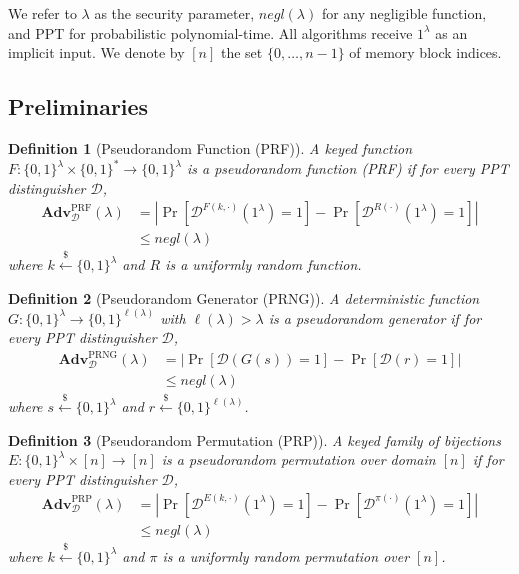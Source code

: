 \documentclass{ieeeaccess}
\newtheorem{definition}{Definition}
\newcommand{\Adv}{\mathbf{Adv}}
\begin{document}
We refer to $\lambda$ as the security parameter, $\mathit{negl}(\lambda)$ for
any negligible function, and PPT for probabilistic polynomial-time.
All algorithms receive $1^{\lambda}$ as an implicit input.
We denote by $[n]$ the set $\{0,\dots,n{-}1\}$ of memory block indices.
 
\subsection{Preliminaries}
\label{sec:prelim}
 
\begin{definition}[Pseudorandom Function (PRF)]
\label{def:prf}
A keyed function $F : \{0,1\}^{\lambda} \times \{0,1\}^{*} \to \{0,1\}^{\lambda}$
is a \emph{pseudorandom function} (PRF) if for every PPT distinguisher
$\mathcal{D}$,
\[
\begin{aligned}
  \Adv^{\mathrm{PRF}}_{\mathcal{D}}(\lambda)
  &=
  \left|
    \Pr\!\left[
      \mathcal{D}^{F(k,\cdot)}(1^{\lambda}) = 1
    \right]
    -
    \Pr\!\left[
      \mathcal{D}^{R(\cdot)}(1^{\lambda}) = 1
    \right]
  \right| \\
  &\leq \mathit{negl}(\lambda)
\end{aligned}
\]
where $k \xleftarrow{\$} \{0,1\}^{\lambda}$ and $R$ is a uniformly random
function.
\end{definition}
 
\begin{definition}[Pseudorandom Generator (PRNG)]
\label{def:prng}
A deterministic function $G : \{0,1\}^{\lambda} \to \{0,1\}^{\ell(\lambda)}$
with $\ell(\lambda) > \lambda$ is a \emph{pseudorandom generator} if for
every PPT distinguisher $\mathcal{D}$,
\[
\begin{aligned}
  \Adv^{\mathrm{PRNG}}_{\mathcal{D}}(\lambda)
  &=
  \left|
    \Pr\!\left[\mathcal{D}(G(s)) = 1\right]
    -
    \Pr\!\left[\mathcal{D}(r) = 1\right]
  \right| \\
  &\leq \mathit{negl}(\lambda)
\end{aligned}
\]
where $s \xleftarrow{\$} \{0,1\}^{\lambda}$ and
$r \xleftarrow{\$} \{0,1\}^{\ell(\lambda)}$.
\end{definition}
 
\begin{definition}[Pseudorandom Permutation (PRP)]
\label{def:prp}
A keyed family of bijections
$E : \{0,1\}^{\lambda} \times [n] \to [n]$
is a \emph{pseudorandom permutation} over domain $[n]$ if for every
PPT distinguisher $\mathcal{D}$,
\[
\begin{aligned}
  \Adv^{\mathrm{PRP}}_{\mathcal{D}}(\lambda)
  &=
  \left|
    \Pr\!\left[\mathcal{D}^{E(k,\cdot)}(1^{\lambda}) = 1\right]
    -
    \Pr\!\left[\mathcal{D}^{\pi(\cdot)}(1^{\lambda}) = 1\right]
  \right|\\
  &\leq \mathit{negl}(\lambda)
\end{aligned}
\]
where $k \xleftarrow{\$} \{0,1\}^{\lambda}$ and $\pi$ is a uniformly random
permutation over $[n]$.
\end{definition}
 
\end{document}

